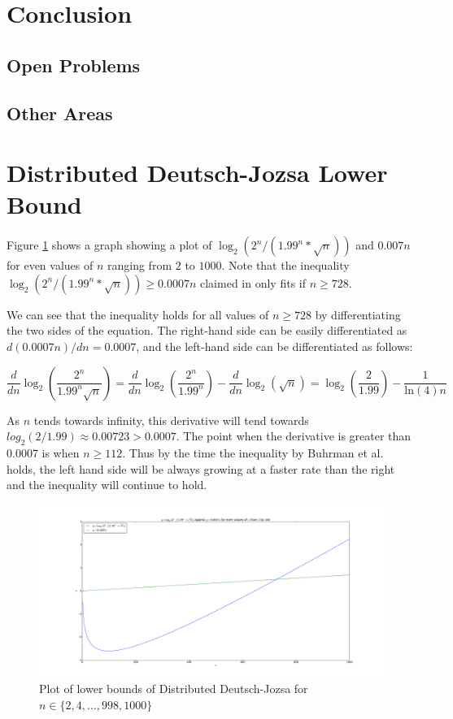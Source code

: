 \documentclass[a4paper]{article}
\begin{document}
    \section{Conclusion}

        \subsection{Open Problems}

        \subsection{Other Areas}

    
    {}

    \appendix
    \section{Distributed Deutsch-Jozsa Lower Bound}
    \label{sec:ddj-lower-bound}

        Figure \ref{fig:ddj-bound} shows a graph showing a plot of $\log_2(2^n/(1.99^n*\sqrt{n}))$ and $0.007n$ for even values of $n$ ranging from $2$ to $1000$. Note that the inequality $\log_2(2^n/(1.99^n*\sqrt{n})) \geq 0.0007n$ claimed in \cite{RevModPhys.82.665} only fits if $n \geq 728$.

        We can see that the inequality holds for all values of $n \geq 728$ by differentiating the two sides of the equation. The right-hand side can be easily differentiated as $d(0.0007n)/dn = 0.0007$, and the left-hand side can be differentiated as follows:

        $$\frac{d}{dn}\log_2\left(\frac{2^n}{1.99^n\sqrt{n}}\right) = \frac{d}{dn}\log_2\left(\frac{2^n}{1.99^n}\right) - \frac{d}{dn}\log_2(\sqrt{n}) = \log_2\left(\frac{2}{1.99}\right) - \frac{1}{\textrm{ln}(4)n}$$

        As $n$ tends towards infinity, this derivative will tend towards $log_2(2/1.99) \approx 0.00723 > 0.0007$. The point when the derivative is greater than 0.0007 is when $n \geq 112$. Thus by the time the inequality by Buhrman et al.~ holds, the left hand side will be always growing at a faster rate than the right and the inequality will continue to hold.

        \begin{figure}
            \includegraphics[width=\linewidth]{ddj_bound}
            \caption{Plot of lower bounds of Distributed Deutsch-Jozsa for $n \in \{2, 4,..., 998, 1000\}$}
            \label{fig:ddj-bound}
        \end{figure}
\end{document}

